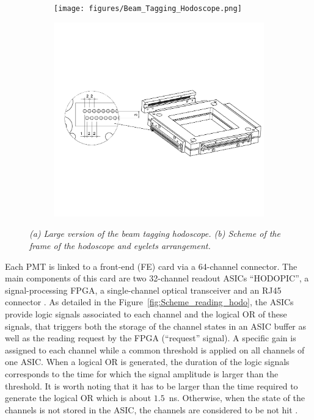 \documentclass[a4paper,11pt]{article}
\begin{document}
\begin{figure}[htb]
\centering
\begin{subfigure}{0.4\textwidth} \centering
\texttt{[image: figures/Beam\_Tagging\_Hodoscope.png]}\caption{}
\label{fig:hodoscope}
\end{subfigure}
\begin{subfigure}{0.4\textwidth} \centering
\includegraphics[width=\textwidth]{figures/Hodoscope_Frame_Scheme.pdf}\caption{}
\label{fig:frame_hodoscope}
\end{subfigure}
\caption{\small{\textit{(a) Large version of the beam tagging hodoscope. (b) Scheme of the frame of the hodoscope and eyelets arrangement.}}}
\label{fig:Hodoscope}
\end{figure}

Each PMT is linked to a front-end (FE) card via a 64-channel connector. The main components of this card are two 32-channel readout ASICs \enquote{HODOPIC}, a signal-processing FPGA, a single-channel optical transceiver and an RJ45 connector \cite{Chen2019}. As detailed in the Figure~\ref{fig:Scheme_reading_hodo}, the ASICs provide logic signals associated to each channel and the logical OR of these signals, that triggers both the storage of the channel states in an ASIC buffer as well as the reading request by the FPGA (\enquote{request} signal). A specific gain is assigned to each channel while a common threshold is applied on all channels of one ASIC. When a logical OR is generated, the duration of the logic signals corresponds to the time for which the signal amplitude is larger than the threshold. It is worth noting that it has to be larger than the time required to generate the logical OR which is about $1.5$~ns. Otherwise, when the state of the channels is not stored in the ASIC, the channels are considered to be not hit .
\end{document}
